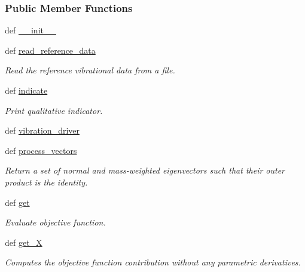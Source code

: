 \subsubsection*{Public Member Functions}
\begin{DoxyCompactItemize}
\item 
def \hyperlink{classforcebalance_1_1gmxio_1_1Vibration__GMX_a6a08013d2854c9df743e5a127ea31f40}{\-\_\-\-\_\-init\-\_\-\-\_\-}
\item 
def \hyperlink{classforcebalance_1_1vibration_1_1Vibration_ad3fc1fdf6452b11933d234b46b07071d}{read\-\_\-reference\-\_\-data}
\begin{DoxyCompactList}\small\item\em Read the reference vibrational data from a file. \end{DoxyCompactList}\item 
def \hyperlink{classforcebalance_1_1vibration_1_1Vibration_a1f13ce8796e3d089c9a361f43844bb98}{indicate}
\begin{DoxyCompactList}\small\item\em Print qualitative indicator. \end{DoxyCompactList}\item 
def \hyperlink{classforcebalance_1_1vibration_1_1Vibration_afa414133f30a224687fcd34eca008744}{vibration\-\_\-driver}
\item 
def \hyperlink{classforcebalance_1_1vibration_1_1Vibration_a5365302b992fdb2656aa2bc0bb6c6079}{process\-\_\-vectors}
\begin{DoxyCompactList}\small\item\em Return a set of normal and mass-\/weighted eigenvectors such that their outer product is the identity. \end{DoxyCompactList}\item 
def \hyperlink{classforcebalance_1_1vibration_1_1Vibration_a3b20f6a97f3aba4f704056ed12a999a5}{get}
\begin{DoxyCompactList}\small\item\em Evaluate objective function. \end{DoxyCompactList}\item 
def \hyperlink{classforcebalance_1_1target_1_1Target_a606dd136f195c267c05a2455405e5949}{get\-\_\-\-X}
\begin{DoxyCompactList}\small\item\em Computes the objective function contribution without any parametric derivatives. \end{DoxyCompactList}\item 

\end{DoxyCompactItemize}
